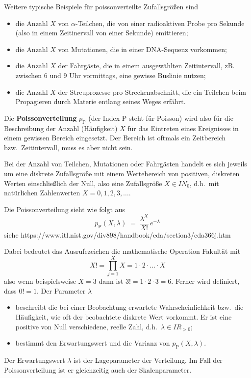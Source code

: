 Weitere typische Beispiele für poissonverteilte Zufallsgrößen sind
\begin{itemize}
\item die Anzahl $X$ von $\alpha$-Teilchen, die von einer radioaktiven Probe pro Sekunde (also in einem Zeitinervall
von einer Sekunde) emittieren;
\item die Anzahl $X$ von Mutationen, die in einer DNA-Sequenz vorkommen;
\item die Anzahl $X$ der Fahrgäste, die in einem ausgewählten Zeitintervall, zB. zwischen 6 und 9 Uhr vormittags, eine gewisse Buslinie nutzen;
\item die Anzahl $X$ der Streuprozesse pro Streckenabschnitt, die ein Teilchen beim Propagieren durch Materie entlang seines Weges erfährt.

\end{itemize}

Die \textbf{Poissonverteilung}  $p_\mathrm{P}$ (der Index $\mathrm{P}$ steht für Poisson) wird also für die Beschreibung
der Anzahl (Häufigkeit) $X$ für das Eintreten eines Ereignisses in einem gewissen Bereich  eingesetzt.
Der Bereich ist oftmals ein Zeitbereich bzw.\ Zeitintervall, muss es aber nicht sein.

Bei der Anzahl von Teilchen, Mutationen oder Fahrgästen handelt es sich jeweils um eine
diskrete Zufallsgröße mit einem Wertebereich von positiven, diskreten Werten einschließlich der Null,
also eine Zufallsgröße $X \in I\!\!N_0$, d.h.\ mit natürlichen Zahlenwerten $X = 0, 1, 2, 3, \dots$.

Die Poissonverteilung sieht wie folgt aus
\begin{equation}
p_\mathrm{P}(X, \lambda) \; = \; \frac{\lambda^X}{X!} \, e^{-\lambda}
\end{equation}
siehe https://www.itl.nist.gov/div898/handbook/eda/section3/eda366j.htm

Dabei bedeutet das Ausrufezeichen die mathematische Operation Fakultät mit
$$
X! = \prod\limits_{j=1}^{X} X = 1 \cdot 2 \cdot \ldots \cdot X
$$
also wenn  beispielsweise $X = 3$ dann ist $3! = 1 \cdot 2 \cdot 3 = 6$.
Ferner wird definiert, dass $0! = 1$.
Der Parameter $\lambda$
\begin{itemize}
\item beschreibt die bei einer Beobachtung erwartete Wahrscheinlichkeit bzw.\ die
Häufigkeit, wie oft der beobachtete diskrete Wert vorkommt. Er ist eine
positive von Null verschiedene, reelle Zahl, d.h.\ $\lambda \in I\!\!R_{> 0}$;
\item bestimmt den Erwartungswert und die Varianz von $p_\mathrm{P}(X, \lambda)$.
\end{itemize}
Der Erwartungswert $\lambda$ ist der Lageparameter der Verteilung.
Im Fall der Poissonverteilung ist er gleichzeitig auch der Skalenparameter.

